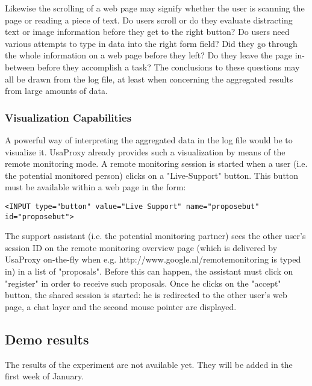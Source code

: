 Likewise the scrolling of a web page may signify whether the user is scanning the page or reading a piece of text. Do users scroll or do they evaluate distracting text or image information before they get to the right button? Do users need various attempts to type in data into the right form field?
Did they go through the whole information on a web page before they left? Do they leave the page in-between before they accomplish a task? The conclusions to these questions may all be drawn from the log file, at least when concerning the aggregated results from large amounts of data.

\subsubsection{Visualization Capabilities}
A powerful way of interpreting the aggregated data in the log file would be to visualize it. UsaProxy already provides such a visualization by means of the remote monitoring mode. A remote monitoring session is started when a user (i.e. the potential monitored person) clicks on a "Live-Support" button. This button must be available within a web page in the form:
\begin{verbatim}
<INPUT type="button" value="Live Support" name="proposebut" id="proposebut">
\end{verbatim}

The support assistant (i.e. the potential monitoring partner) sees the other user's session ID on the remote monitoring overview page (which is delivered by UsaProxy on-the-fly when e.g. http://www.google.nl/remotemonitoring is typed in) in a list of "proposals". Before this can happen, the assistant must click on "register" in order to receive such proposals. Once he clicks on the "accept" button, the shared session is started: he is redirected to the other user's web page, a chat layer and the second mouse pointer are displayed. 

\subsection{Demo results}
The results of the experiment are not available yet. They will be added in the first week of January.